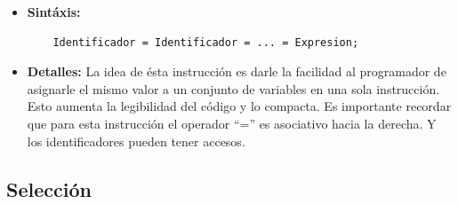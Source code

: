 \documentclass[11pt, spanish]{report}
\begin{document}
\begin{itemize}
\item \textbf{Sint\'axis:}

  \begin{verbatim}
    Identificador = Identificador = ... = Expresion;
  \end{verbatim}

\item \textbf{Detalles:}
  La idea de \'esta instrucci\'on es darle la facilidad al programador de asignarle el mismo valor a un conjunto de variables en una sola instrucci\'on. Esto 
  aumenta la legibilidad del c\'odigo y lo compacta. Es importante recordar que para esta instrucci\'on el operador ``='' es asociativo hacia la derecha. Y los identificadores pueden tener accesos.\\
\end{itemize}

\subsection{Selecci\'on}
\end{document}
